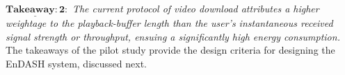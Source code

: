 $\mathrm{\mathbf{\underline{Takeaway:2}}}:$ \textit{The current protocol of  video download attributes a higher weightage to the playback-buffer length than the user's instantaneous received signal strength or throughput, ensuing a significantly high energy consumption.}\\
\indent The takeaways of the pilot study provide the design criteria for designing the EnDASH system, discussed next. 
